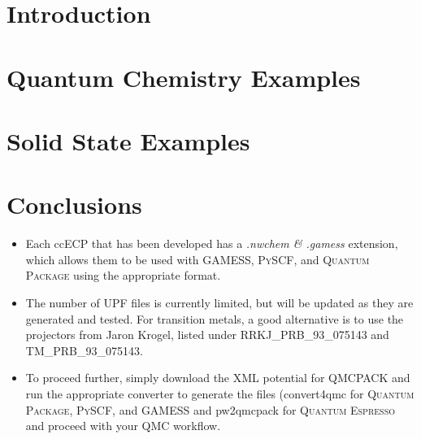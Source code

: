 \documentclass[12pt,unknownkeysallowed,aspectratio=169,usenames,dvipsnames]{beamer}
\begin{document}

\begin{frame}
    \titlepage
\end{frame}

\section{Introduction}

\section{Quantum Chemistry Examples}

\section{Solid State Examples}


\section{Conclusions}
\begin{frame}
    \begin{itemize}
        \item Each ccECP that has been developed has a {\it .nwchem \& .gamess} extension, which allows them to be used with \textsc{GAMESS}, \textsc{PySCF}, and  \textsc{Quantum Package} using the appropriate format. 
        \item The number of UPF files is currently limited, but will be updated as they are generated and tested. For transition metals, a good alternative is to use the projectors from Jaron Krogel, listed under RRKJ\_PRB\_93\_075143 and TM\_PRB\_93\_075143. 
        \item To proceed further, simply download the XML potential for \textsc{QMCPACK} and run the appropriate converter to generate the files (convert4qmc for  \textsc{Quantum Package}, \textsc{PySCF}, and \textsc{GAMESS} and pw2qmcpack for \textsc{Quantum Espresso} and proceed with your QMC workflow.
    \end{itemize}
\end{frame}
\end{document}
